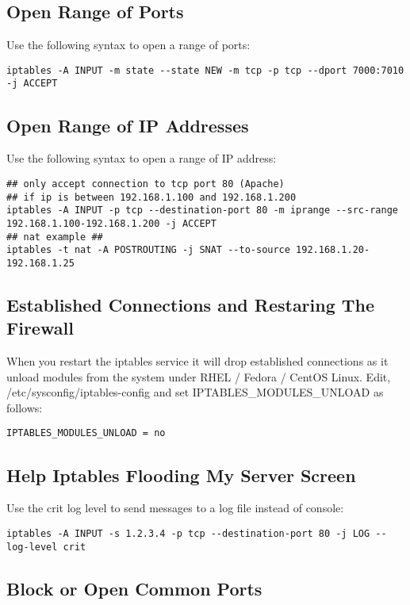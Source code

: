 \subsection{Open Range of Ports}

Use the following syntax to open a range of ports:
\begin{verbatim}
iptables -A INPUT -m state --state NEW -m tcp -p tcp --dport 7000:7010 -j ACCEPT
\end{verbatim}

\subsection{Open Range of IP Addresses}

Use the following syntax to open a range of IP address:
\begin{verbatim}
## only accept connection to tcp port 80 (Apache) 
## if ip is between 192.168.1.100 and 192.168.1.200 
iptables -A INPUT -p tcp --destination-port 80 -m iprange --src-range 192.168.1.100-192.168.1.200 -j ACCEPT
## nat example ##
iptables -t nat -A POSTROUTING -j SNAT --to-source 192.168.1.20-192.168.1.25
\end{verbatim}

\subsection{Established Connections and Restaring The Firewall}

When you restart the iptables service it will drop established
connections as it unload modules from the system under RHEL / Fedora /
CentOS Linux. Edit, /etc/sysconfig/iptables-config and set
IPTABLES\_MODULES\_UNLOAD as follows:
\begin{verbatim}
IPTABLES_MODULES_UNLOAD = no
\end{verbatim}

\subsection{Help Iptables Flooding My Server Screen}

Use the crit log level to send messages to a log file instead of console:

\begin{verbatim}
iptables -A INPUT -s 1.2.3.4 -p tcp --destination-port 80 -j LOG --log-level crit
\end{verbatim}

\subsection{Block or Open Common Ports}


